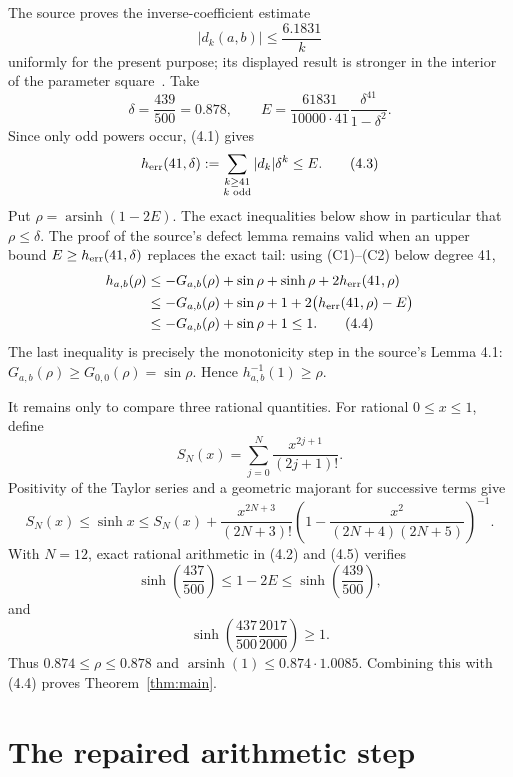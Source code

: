 \documentclass[11pt]{article}
\newcommand{\arsinh}{\operatorname{arsinh}}
\begin{document}
The source proves the inverse-coefficient estimate
\[
                         |d_k(a,b)|\leq\frac{6.1831}{k}  \tag{4.1}
\]
uniformly for the present purpose; its displayed result is stronger in the
interior of the parameter square~\cite[Lemma 4.7]{BGGLT}.  Take
\[
 \delta=\frac{439}{500}=0.878,
 \qquad
 E=\frac{61831}{10000\cdot41}
       \frac{\delta^{41}}{1-\delta^2}.                  \tag{4.2}
\]
Since only odd powers occur, (4.1) gives
\[
 h_{\rm err}(41,\delta)
 :=\sum_{\substack{k\geq41\\k\text{ odd}}}|d_k|\delta^k
 \leq E.                                                \tag{4.3}
\]
Put $\rho=\arsinh(1-2E)$.  The exact inequalities below show in particular
that $\rho\leq\delta$.  The proof of the source's defect lemma remains valid
when an upper bound $E\geq h_{\rm err}(41,\delta)$ replaces the exact tail:
using (C1)--(C2) below degree 41,
\begin{align*}
 h_{a,b}(\rho)
 &\leq-G_{a,b}(\rho)+\sin\rho+\sinh\rho
                         +2h_{\rm err}(41,\rho)\\
 &\leq-G_{a,b}(\rho)+\sin\rho+1
   +2\bigl(h_{\rm err}(41,\rho)-E\bigr)\\
 &\leq-G_{a,b}(\rho)+\sin\rho+1\leq1.                \tag{4.4}
\end{align*}
The last inequality is precisely the monotonicity step in the source's
Lemma 4.1: $G_{a,b}(\rho)\geq G_{0,0}(\rho)=\sin\rho$.
Hence $h_{a,b}^{-1}(1)\geq\rho$.

It remains only to compare three rational quantities.  For rational
$0\leq x\leq1$, define
\[
 S_N(x)=\sum_{j=0}^{N}\frac{x^{2j+1}}{(2j+1)!}.
\]
Positivity of the Taylor series and a geometric majorant for successive
terms give
\[
 S_N(x)\leq\sinh x\leq S_N(x)+
 \frac{x^{2N+3}}{(2N+3)!}
 \left(1-\frac{x^2}{(2N+4)(2N+5)}\right)^{-1}.          \tag{4.5}
\]
With $N=12$, exact rational arithmetic in (4.2) and (4.5) verifies
\[
 \sinh\!\left(\frac{437}{500}\right)\leq{}1-2E
 \leq\sinh\!\left(\frac{439}{500}\right),             \tag{4.6}
\]
and
\[
 \sinh\!\left(\frac{437}{500}\frac{2017}{2000}\right)
 \geq1.                                                  \tag{4.7}
\]
Thus $0.874\leq\rho\leq0.878$ and
$\arsinh(1)\leq0.874\cdot1.0085$.  Combining this with (4.4) proves
Theorem~\ref{thm:main}.

\section{The repaired arithmetic step}
\end{document}

